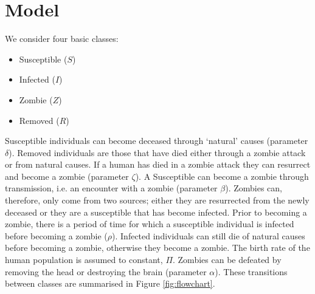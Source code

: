 \documentclass[]{article}
\begin{document}


\section{Model}
\label{model}

We consider four basic classes:
\begin{itemize}
	\item Susceptible ($S$)
	\item Infected ($I$)
	\item Zombie ($Z$)
	\item Removed ($R$)
\end{itemize}

Susceptible individuals can become deceased through `natural' causes (parameter $\delta$). Removed individuals are those that have died either through a zombie attack or from natural causes. If a human has died in a zombie attack they can resurrect and become a zombie (parameter $\zeta$). A Susceptible can become a zombie through transmission, i.e. an encounter with a zombie (parameter $\beta$). Zombies can, therefore, only come from two sources; either they are resurrected from the newly deceased or they are a susceptible that has become infected. Prior to becoming a zombie, there is a period of time for which a susceptible individual is infected before becoming a zombie ($\rho$). Infected individuals can still die of natural causes before becoming a zombie, otherwise they become a zombie. The birth rate of the human population is assumed to constant, $\Pi$. Zombies can be defeated by removing the head or destroying the brain (parameter $\alpha$). These transitions between classes are summarised in Figure \ref{fig:flowchart}.
\end{document}
